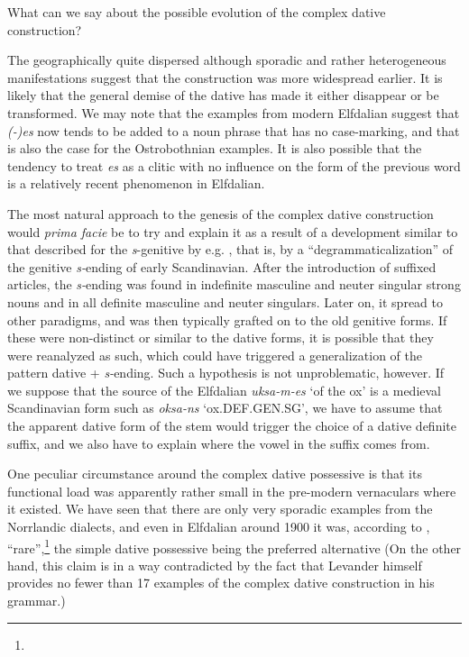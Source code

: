 \begin{styleBodytextC}
What can we say about the possible evolution of the complex dative construction? 

\end{styleBodytextC}

\begin{styleBodytextC}
The geographically quite dispersed although sporadic and rather heterogeneous manifestations suggest that the construction was more widespread earlier. It is likely that the general demise of the dative has made it either disappear or be transformed. We may note that the examples from modern Elfdalian suggest that \textit{(-)es }now tends to be added to a noun phrase that has no case-marking, and that is also the case for the Ostrobothnian examples. It is also possible that the tendency to treat \textit{es} as a clitic with no influence on the form of the previous word is a relatively recent phenomenon in Elfdalian.  

\end{styleBodytextC}

\begin{styleBodytextC}
The most natural approach to the genesis of the complex dative construction would \textit{prima facie} be to try and explain it as a result of a development similar to that described for the \textit{s}{}-genitive by e.g. \citet{Norde1997}, that is, by a “degrammaticalization” of the genitive \textit{s-}ending of early Scandinavian. After the introduction of suffixed articles, the \textit{s-}ending was found in indefinite masculine and neuter singular strong nouns and in all definite masculine and neuter singulars. Later on, it spread to other paradigms, and was then typically grafted on to the old genitive forms. If these were non-distinct or similar to the dative forms, it is possible that they were reanalyzed as such, which could have triggered a generalization of the pattern dative + \textit{s-}ending. Such a hypothesis is not unproblematic, however. If we suppose that the source of the Elfdalian \textit{uksa-m-es} ‘of the ox’ is a medieval Scandinavian form such as \textit{oksa-ns} ‘ox.DEF.GEN.SG’, we have to assume that the apparent dative form of the stem would trigger the choice of a dative definite suffix, and we also have to explain where the vowel in the suffix comes from. 

\end{styleBodytextC}

\begin{styleBodytextC}
One peculiar circumstance around the complex dative possessive is that its functional load was apparently rather small in the pre-modern vernaculars where it existed. We have seen that there are only very sporadic examples from the Norrlandic dialects, and even in Elfdalian around 1900 it was, according to \citet[98-99]{Levander1909}, “rare”,\footnote{} the simple dative possessive being the preferred alternative (On the other hand, this claim is in a way contradicted by the fact that Levander himself provides no fewer than 17 examples of the complex dative construction in his grammar.) 

\end{styleBodytextC}

